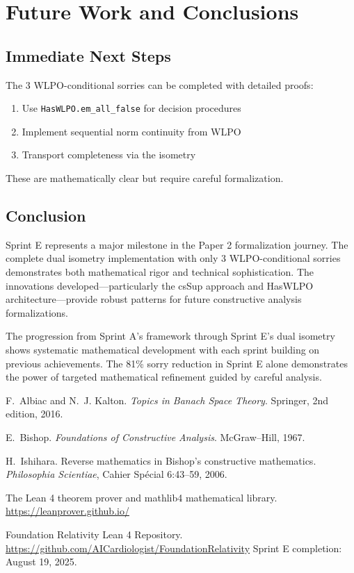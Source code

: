 \documentclass[11pt]{article}
\theoremstyle{definition}
\theoremstyle{remark}
\begin{document}
\section{Future Work and Conclusions}\label{sec:conclusion}

\subsection{Immediate Next Steps}

\begin{mdframed}[style=roadmap]
The 3 WLPO-conditional sorries can be completed with detailed proofs:
\begin{enumerate}
\item Use \texttt{HasWLPO.em\_all\_false} for decision procedures
\item Implement sequential norm continuity from WLPO
\item Transport completeness via the isometry
\end{enumerate}
These are mathematically clear but require careful formalization.
\end{mdframed}

\subsection{Conclusion}

Sprint E represents a major milestone in the Paper 2 formalization journey. The complete dual isometry implementation with only 3 WLPO-conditional sorries demonstrates both mathematical rigor and technical sophistication. The innovations developed—particularly the csSup approach and HasWLPO architecture—provide robust patterns for future constructive analysis formalizations.

The progression from Sprint A's framework through Sprint E's dual isometry shows systematic mathematical development with each sprint building on previous achievements. The 81\% sorry reduction in Sprint E alone demonstrates the power of targeted mathematical refinement guided by careful analysis.

\begin{thebibliography}{10}

F.~Albiac and N.~J. Kalton.
\newblock \emph{Topics in Banach Space Theory}.
\newblock Springer, 2nd edition, 2016.

E.~Bishop.
\newblock \emph{Foundations of Constructive Analysis}.
\newblock McGraw--Hill, 1967.

H.~Ishihara.
\newblock Reverse mathematics in Bishop's constructive mathematics.
\newblock \emph{Philosophia Scientiae}, Cahier Spécial 6:43--59, 2006.

The Lean 4 theorem prover and mathlib4 mathematical library.
\newblock \url{https://leanprover.github.io/}

Foundation Relativity Lean 4 Repository.
\newblock \url{https://github.com/AICardiologist/FoundationRelativity}
\newblock Sprint E completion: August 19, 2025.

\end{thebibliography}
\end{document}
